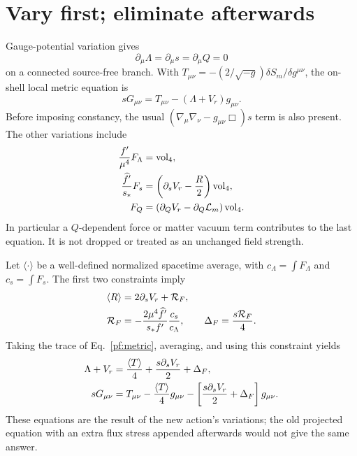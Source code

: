 \documentclass[11pt]{article}
\begin{document}
\section{Vary first; eliminate afterwards}
Gauge-potential variation gives
\begin{equation}
 \partial_\mu\Lambda=\partial_\mu s=\partial_\mu Q=0
\end{equation}
on a connected source-free branch. With
$T_{\mu\nu}=-(2/\sqrt{-g})\delta S_m/\delta g^{\mu\nu}$, the
on-shell local metric equation is
\begin{equation}
 sG_{\mu\nu}=T_{\mu\nu}-(\Lambda+V_r)g_{\mu\nu}.
 \label{pf:metric}
\end{equation}
Before imposing constancy, the usual
$(\nabla_\mu\nabla_\nu-g_{\mu\nu}\Box)s$ term is also present.
The other variations include
\begin{align}
 {f'\over\mu^4}F_\Lambda&=\mathrm{vol}_4,\\
 {\widehat f'\over s_*}F_s
      &=\left(\partial_s V_r-{R\over2}\right)\mathrm{vol}_4,\\
 F_Q&=\left(\partial_QV_r-\partial_Q\mathcal L_m\right)
                                                  \mathrm{vol}_4.
 \label{pf:auxiliary}
\end{align}
In particular a $Q$-dependent force or matter vacuum term contributes to
the last equation. It is not dropped or treated as an unchanged field
strength.

Let $\langle\cdot\rangle$ be a well-defined normalized spacetime average,
with $c_\Lambda=\int F_\Lambda$ and $c_s=\int F_s$. The first two
constraints imply
\begin{align}
 \langle R\rangle&=2\partial_sV_r+\mathcal R_F,\\
 \mathcal R_F&=-{2\mu^4\widehat f'\over s_*f'}
                                      {c_s\over c_\Lambda},\qquad
 \Delta_F={s\mathcal R_F\over4}.
\end{align}
Taking the trace of Eq.~\eqref{pf:metric}, averaging, and using this
constraint yields
\begin{align}
 \Lambda+V_r&={\langle T\rangle\over4}
                   +{s\partial_sV_r\over2}+\Delta_F,\\
 sG_{\mu\nu}&=T_{\mu\nu}-{\langle T\rangle\over4}g_{\mu\nu}
                -\left[{s\partial_sV_r\over2}+\Delta_F\right]g_{\mu\nu}.
 \label{pf:projected}
\end{align}
These equations are the result of the new action's variations; the old
projected equation with an extra flux stress appended afterwards would
not give the same answer.
\end{document}
